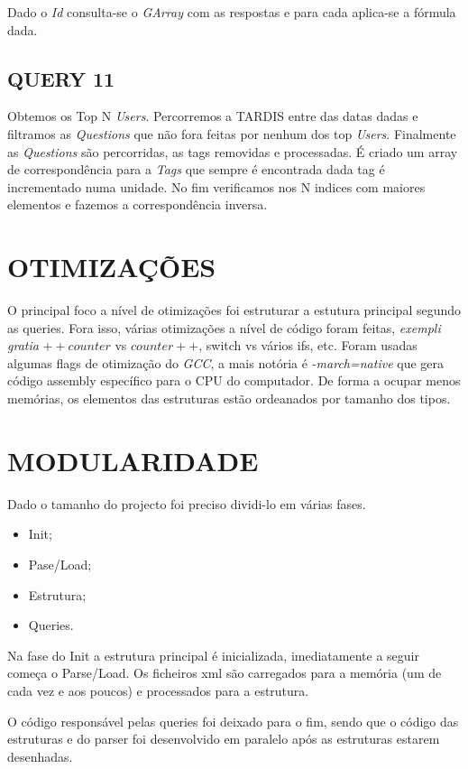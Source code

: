 \documentclass[letterpaper, 10 pt, conference]{IEEEtran}  %
\begin{document}
Dado o \textit{Id} consulta-se o \textit{GArray} com as respostas e para cada aplica-se a fórmula dada.
\subsection{QUERY 11}

Obtemos os Top N \textit{Users}.
Percorremos a TARDIS entre das datas dadas e filtramos as \textit{Questions} que não fora feitas por nenhum dos top \textit{Users}. Finalmente as \textit{Questions} são percorridas, as tags removidas e processadas.
É criado um array de correspondência para a \textit{Tags} que sempre é encontrada dada tag é incrementado numa unidade. No fim verificamos nos N indices com maiores elementos e fazemos a correspondência inversa.


\section{OTIMIZAÇÕES}

O principal foco a nível de otimizações foi estruturar a estutura principal segundo as queries. Fora isso, várias otimizações a nível de código foram feitas, \textit{exempli gratia} $++counter$ vs $counter++$, switch vs vários ifs, etc.
Foram usadas algumas flags de otimização do \textit{GCC}, a mais notória é \textit{-march=native} que gera código assembly específico para o CPU do computador.
De forma a ocupar menos memórias, os elementos das estruturas estão ordeanados por tamanho dos tipos.

\section{MODULARIDADE}

Dado o tamanho do projecto foi preciso dividi-lo em várias fases.

\begin{itemize}
\item Init;
\item Pase/Load;
\item Estrutura;
\item Queries.
\end{itemize}

Na fase do Init a estrutura principal é inicializada, imediatamente a seguir começa o Parse/Load. Os ficheiros xml são carregados para a memória (um de cada vez e aos poucos) e processados para a estrutura.

O código responsável pelas queries foi deixado para o fim, sendo que o código das estruturas e do parser foi desenvolvido em paralelo após as estruturas estarem desenhadas.
\end{document}

